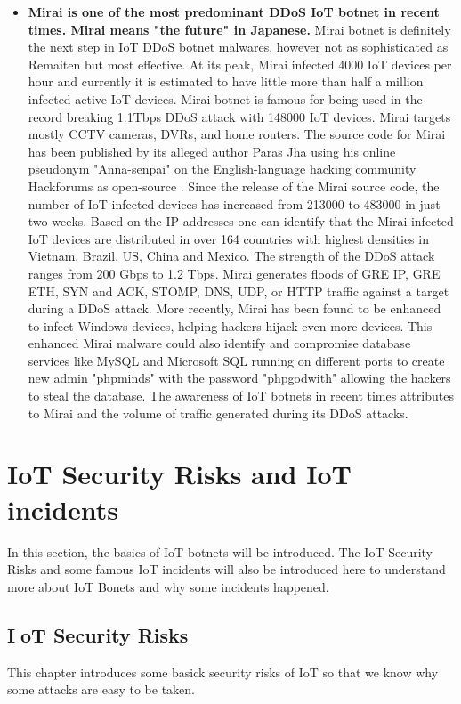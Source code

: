 \documentclass[conference]{IEEEtran}
\begin{document}
\begin{itemize}
\item{
\textbf{
Mirai is one of the most predominant DDoS IoT botnet in
recent times. Mirai means "the future" in Japanese. }Mirai
botnet is definitely the next step in IoT DDoS botnet malwares,
however not as sophisticated as Remaiten but most
effective. At its peak, Mirai infected 4000 IoT devices
per hour and currently it is estimated to have little more
than half a million infected active IoT devices. Mirai
botnet is famous for being used in the record breaking
1.1Tbps DDoS attack with 148000 IoT devices. Mirai
targets mostly CCTV cameras, DVRs, and home routers.
The source code for Mirai has been published by its
alleged author Paras Jha using his online pseudonym
"Anna-senpai" on the English-language hacking community
Hackforums as open-source . Since the release of
the Mirai source code, the number of IoT infected devices
has increased from 213000 to 483000 in just two weeks.
Based on the IP addresses one can identify that the Mirai
infected IoT devices are distributed in over 164 countries
with highest densities in Vietnam, Brazil, US, China and
Mexico. The strength of the DDoS attack
ranges from 200 Gbps to 1.2 Tbps. Mirai generates floods
of GRE IP, GRE ETH, SYN and ACK, STOMP, DNS,
UDP, or HTTP traffic against a target during a DDoS
attack. More recently, Mirai has been
found to be enhanced to infect Windows devices, helping
hackers hijack even more devices. This enhanced Mirai
malware could also identify and compromise database
services like MySQL and Microsoft SQL running on
different ports to create new admin "phpminds" with the
password "phpgodwith" allowing the hackers to steal the
database. The awareness of IoT botnets in recent times
attributes to Mirai and the volume of traffic generated
during its DDoS attacks.\cite{b2}}


\end{itemize}



\section{\textbf{IoT Security Risks and IoT incidents }}
In this section, the basics of IoT botnets will be introduced. The IoT Security Risks and some famous IoT incidents will also be introduced here to understand more about IoT Bonets and why some incidents happened.

\subsection{\textbf{IoT Security Risks}}
This chapter introduces some basick security risks of IoT so that we know why some attacks are easy to be taken.
\end{document}
